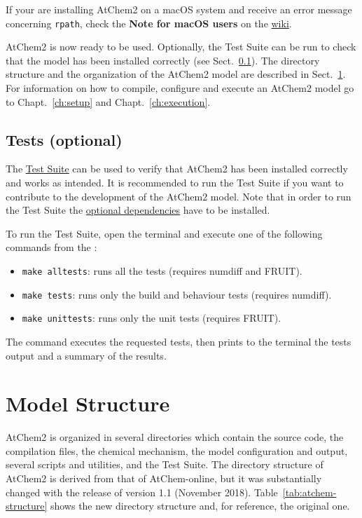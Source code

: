 If your are installing AtChem2 on a macOS system and receive an error message
concerning \texttt{rpath}, check the \textbf{Note for macOS users} on the
\href{https://github.com/AtChem/AtChem2/wiki/How-to-install-AtChem2}{wiki}.

AtChem2 is now ready to be used. Optionally, the Test Suite can be run
to check that the model has been installed correctly (see
Sect.~\ref{subsec:tests-optional}). The directory structure and the
organization of the AtChem2 model are described in
Sect.~\ref{sec:model-structure}. For information on how to compile,
configure and execute an AtChem2 model go to Chapt.~\ref{ch:setup} and
Chapt.~\ref{ch:execution}.

\subsection{Tests (optional)} \label{subsec:tests-optional}

The \hyperref[sec:test-suite]{Test Suite} can be used to verify that
AtChem2 has been installed correctly and works as intended. It is
recommended to run the Test Suite if you want to contribute to the
development of the AtChem2 model. Note that in order to run the Test
Suite the \hyperref[subsec:optional-dependencies]{optional dependencies}
have to be installed.

To run the Test Suite, open the terminal and execute one of the
following commands from the \maindir:

\begin{itemize}
\item \verb|make alltests|: runs all the tests (requires numdiff and
  FRUIT).
\item \verb|make tests|: runs only the build and behaviour tests
  (requires numdiff).
\item \verb|make unittests|: runs only the unit tests (requires
  FRUIT).
\end{itemize}

The command executes the requested tests, then prints to the terminal
the tests output and a summary of the results.

\section{Model Structure} \label{sec:model-structure}

AtChem2 is organized in several directories which contain the source
code, the compilation files, the chemical mechanism, the model
configuration and output, several scripts and utilities, and the Test
Suite. The directory structure of AtChem2 is derived from that of
AtChem-online, but it was substantially changed with the release of
version 1.1 (November 2018). Table~\ref{tab:atchem-structure} shows
the new directory structure and, for reference, the original one.

